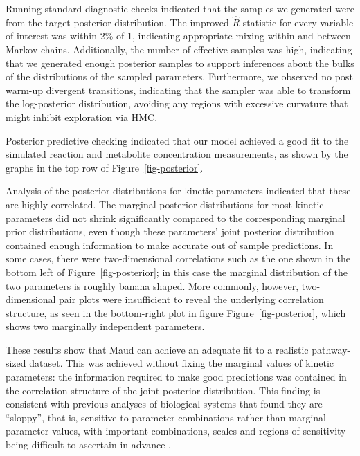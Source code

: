 \documentclass[journal=asbcd6,manuscript=article,layout=traditional]{achemso}
\begin{document}
Running standard diagnostic checks indicated that the samples we
generated were from the target posterior distribution. The improved
\(\hat{R}\) statistic
\citep{vehtariRankNormalizationFoldingLocalization2021} for every
variable of interest was within 2\% of 1, indicating appropriate mixing
within and between Markov chains. Additionally, the number of effective
samples was high, indicating that we generated enough posterior samples
to support inferences about the bulks of the distributions of the
sampled parameters. Furthermore, we observed no post warm-up divergent
transitions, indicating that the sampler was able to transform the
log-posterior distribution, avoiding any regions with excessive
curvature that might inhibit exploration via HMC.

Posterior predictive checking indicated that our model achieved a good
fit to the simulated reaction and metabolite concentration measurements,
as shown by the graphs in the top row of Figure~\ref{fig-posterior}.

Analysis of the posterior distributions for kinetic parameters indicated
that these are highly correlated. The marginal posterior distributions
for most kinetic parameters did not shrink significantly compared to the
corresponding marginal prior distributions, even though these
parameters' joint posterior distribution contained enough information to
make accurate out of sample predictions. In some cases, there were
two-dimensional correlations such as the one shown in the bottom left of
Figure~\ref{fig-posterior}; in this case the marginal distribution of
the two parameters is roughly banana shaped. More commonly, however,
two-dimensional pair plots were insufficient to reveal the underlying
correlation structure, as seen in the bottom-right plot in figure
Figure~\ref{fig-posterior}, which shows two marginally independent
parameters.

These results show that Maud can achieve an adequate fit to a realistic
pathway-sized dataset. This was achieved without fixing the marginal
values of kinetic parameters: the information required to make good
predictions was contained in the correlation structure of the joint
posterior distribution. This finding is consistent with previous
analyses of biological systems that found they are ``sloppy'', that is,
sensitive to parameter combinations rather than marginal parameter
values, with important combinations, scales and regions of sensitivity
being difficult to ascertain in advance
\citep{gutenkunst_2007, poirier_revising_1998}.
\end{document}
